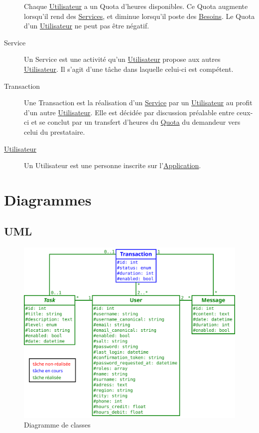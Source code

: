 \documentclass[french,12pt]{article}
\begin{document}
\begin{description}
				Chaque \hyperlink{utilisateur}{Utilisateur} a un Quota d’heures
				 disponibles. Ce Quota augmente lorsqu’il rend des
				 \hyperlink{service}{Services}, et diminue lorsqu’il poste des
				 \hyperlink{besoin}{Besoins}. Le Quota d’un
				 \hyperlink{utilisateur}{Utilisateur} ne peut pas être négatif.
			\item[\hypertarget{service}{Service}]
				Un Service est une activité qu’un \hyperlink{utilisateur}{Utilisateur}
				 propose aux autres \hyperlink{utilisateur}{Utilisateur}. Il s’agit
				 d’une tâche dans laquelle celui-ci est compétent.
			\item[\hypertarget{transaction}{Transaction}]
				Une Transaction est la réalisation d’un \hyperlink{service}{Service} par
				 un \hyperlink{utilisateur}{Utilisateur} au profit d’un autre
				 \hyperlink{utilisateur}{Utilisateur}. Elle est décidée par discussion
				 préalable entre ceux-ci et se conclut par un transfert
				 d’heures du \hyperlink{quota}{Quota} du demandeur vers celui du
				 prestataire.
			\item[\hypertarget{utilisateur}{\hyperlink{utilisateur}{Utilisateur}}]
				Un Utilisateur est une personne inscrite sur
				 l’\hyperlink{application}{Application}.
		\end{description}

	\newpage
	\section{Diagrammes}
		\localtableofcontents

		\newpage
		\subsection{UML}

			\vspace*{\fill}
			\begin{figure}[h]
				\centering
				\includegraphics[width=\columnwidth]{uml}
				\caption{Diagramme de classes}
			\end{figure}
			\vspace*{\fill}
\end{document}

